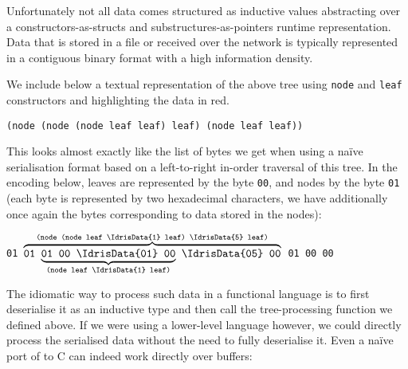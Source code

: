 Unfortunately not all data comes structured as inductive values
abstracting over a constructors-as-structs and substructures-as-pointers
runtime representation.
%
Data that is stored in a file or received over the network is
typically represented in a contiguous binary format with
a high information density.

We include below a textual representation of the above tree using
\texttt{node} and \texttt{leaf} constructors and highlighting the
data in red.

\begin{center}
  \usestt
  \texttt{(node (node (node leaf  leaf)  leaf)  (node leaf  leaf))}
\end{center}

This looks almost exactly like the list of bytes we get when using a
naïve serialisation format based on a left-to-right in-order traversal
of this tree.
%
In the encoding below,
leaves are represented by the byte \texttt{00},
and nodes by the byte \texttt{01}
(each byte is represented by two hexadecimal characters,
we have additionally once again  the bytes
corresponding to data stored in the nodes):

\begin{center}
  \usestt
      \texttt{01 $\overbrace{\texttt{01 $\underbrace{\texttt{01 00 \IdrisData{01} 00}}_{\texttt{(node leaf \IdrisData{1} leaf)}}$
    \IdrisData{05} 00}}^{\texttt{(node (node leaf \IdrisData{1} leaf) \IdrisData{5} leaf)}}$
     01 00  00}
\end{center}

The idiomatic way to process such data in a functional language
is to first deserialise it as an inductive type and then call
the tree-processing  function we defined above.
%
If we were using a lower-level language however, we could directly
process the serialised data without the need to fully deserialise it.
%
Even a naïve port of  to C can indeed work
directly over buffers:

{\usestt }


